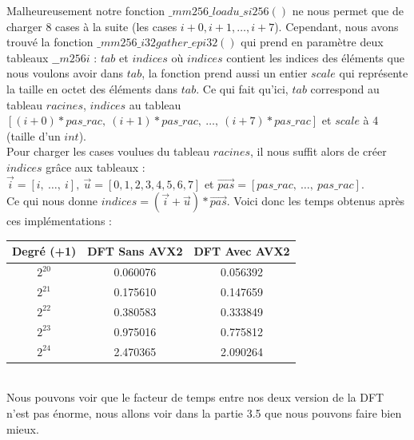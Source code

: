 \documentclass[12pt, a4paper]{article}
\begin{document}
Malheureusement notre fonction $\_mm256\_loadu\_si256()$ ne nous permet que de charger 8 cases à la suite (les cases $i+0, i+1,\dots,i+7$).
Cependant, nous avons trouvé la fonction $\_mm256\_i32gather\_epi32()$ qui prend en paramètre deux tableaux $\_\_m256i$ : $tab$ et $indices$ où $indices$ contient les indices des éléments que nous voulons avoir dans $tab$, la fonction prend aussi un entier $scale$ qui représente la taille en octet des éléments dans $tab$. Ce qui fait qu'ici, $tab$ correspond au tableau $racines$, $indices$ au tableau $[(i+0)*pas\_rac,\ (i+1)*pas\_rac,\ \dots,\ (i+7)*pas\_rac]$ et $scale$ à 4 (taille d'un $int$).\\
\indent Pour charger les cases voulues du tableau $racines$, il nous suffit alors de créer $indices$ grâce aux tableaux : \\ $\overrightarrow{i} = [i,\ \dots,\ i],\  \overrightarrow{u} = [0, 1, 2, 3, 4, 5, 6, 7]$ et $ \overrightarrow{pas} = [pas\_rac,\ \dots,\ pas\_rac]$. \\
Ce qui nous donne $indices = (\overrightarrow{i}+\overrightarrow{u})*\overrightarrow{pas}$.
\newpage	
Voici donc les temps obtenus après ces implémentations :

\begin{center}
\begin{tabular}{||c c c||}
\hline
Degré (+1) & DFT Sans AVX2 & DFT Avec AVX2 \\
\hline\hline
$2^{20}$ & 0.060076 & 0.056392 \\
\hline
$2^{21}$ & 0.175610 & 0.147659 \\
\hline
$2^{22}$ & 0.380583 & 0.333849 \\
\hline
$2^{23}$ & 0.975016 & 0.775812 \\
\hline
$2^{24}$ & 2.470365 & 2.090264 \\
\hline
\end{tabular}
\end{center}
{}
\ \\
\indent Nous pouvons voir que le facteur de temps entre nos deux version de la DFT n'est pas énorme, nous allons voir dans la partie 3.5 que nous pouvons faire bien mieux.
\end{document}
